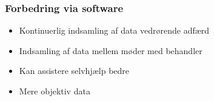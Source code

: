 \begin{frame}
\frametitle{Forbedring via software}

\begin{itemize}
\item Kontinuerlig indsamling af data vedrørende adfærd
\item Indsamling af data mellem møder med behandler
\item Kan assistere selvhjælp bedre
\item Mere objektiv data
\end{itemize}

\end{frame}
